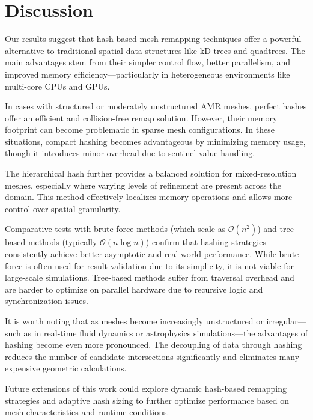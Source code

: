\section{Discussion}

Our results suggest that hash-based mesh remapping techniques offer a powerful alternative to traditional spatial data structures like kD-trees and quadtrees. The main advantages stem from their simpler control flow, better parallelism, and improved memory efficiency—particularly in heterogeneous environments like multi-core CPUs and GPUs.

In cases with structured or moderately unstructured AMR meshes, perfect hashes offer an efficient and collision-free remap solution. However, their memory footprint can become problematic in sparse mesh configurations. In these situations, compact hashing becomes advantageous by minimizing memory usage, though it introduces minor overhead due to sentinel value handling.

The hierarchical hash further provides a balanced solution for mixed-resolution meshes, especially where varying levels of refinement are present across the domain. This method effectively localizes memory operations and allows more control over spatial granularity.

Comparative tests with brute force methods (which scale as $\mathcal{O}(n^2)$) and tree-based methods (typically $\mathcal{O}(n \log n)$) confirm that hashing strategies consistently achieve better asymptotic and real-world performance. While brute force is often used for result validation due to its simplicity, it is not viable for large-scale simulations. Tree-based methods suffer from traversal overhead and are harder to optimize on parallel hardware due to recursive logic and synchronization issues.

It is worth noting that as meshes become increasingly unstructured or irregular—such as in real-time fluid dynamics or astrophysics simulations—the advantages of hashing become even more pronounced. The decoupling of data through hashing reduces the number of candidate intersections significantly and eliminates many expensive geometric calculations.

Future extensions of this work could explore dynamic hash-based remapping strategies and adaptive hash sizing to further optimize performance based on mesh characteristics and runtime conditions.

